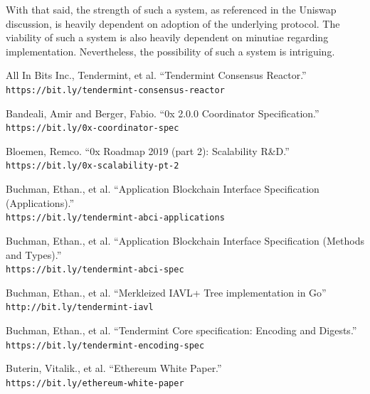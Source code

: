 \documentclass[10pt]{article}
\begin{document}
With that said, the strength of such a system, as referenced in the Uniswap discussion, is heavily dependent on adoption of the underlying protocol. The viability of such a system is also heavily dependent on minutiae regarding implementation. Nevertheless, the possibility of such a system is intriguing.
\clearpage
\pagebreak


\begin{thebibliography}{9}

All In Bits Inc., Tendermint, et al. ``Tendermint Consensus Reactor.''
\\\texttt{https://bit.ly/tendermint-consensus-reactor}

Bandeali, Amir and Berger, Fabio. ``0x 2.0.0 Coordinator Specification.''
\\\texttt{https://bit.ly/0x-coordinator-spec}

Bloemen, Remco. ``0x Roadmap 2019 (part 2): Scalability R\&D.''
\\\texttt{https://bit.ly/0x-scalability-pt-2}

Buchman, Ethan., et al. ``Application Blockchain Interface Specification (Applications).''
\\\texttt{https://bit.ly/tendermint-abci-applications}

Buchman, Ethan., et al. ``Application Blockchain Interface Specification (Methods and Types).''
\\\texttt{https://bit.ly/tendermint-abci-spec}

Buchman, Ethan., et al. ``Merkleized IAVL+ Tree implementation in Go''
\\\texttt{http://bit.ly/tendermint-iavl}

Buchman, Ethan., et al. ``Tendermint Core specification: Encoding and Digests.''
\\\texttt{https://bit.ly/tendermint-encoding-spec}

Buterin, Vitalik., et al. ``Ethereum White Paper.''
\\\texttt{https://bit.ly/ethereum-white-paper}


\end{thebibliography}
\end{document}
